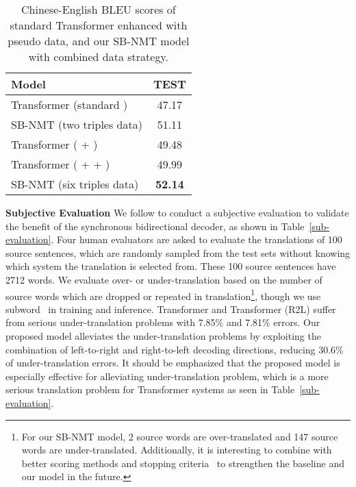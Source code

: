 \documentclass[11pt,a4paper]{article}
\begin{document}
\begin{CJK*}{UTF8}{gbsn}
\begin{table}
	\setlength{\belowcaptionskip}{-0.2cm}
	\centering
	\begin{tabular}{l|c}
		\hline
		Model                 &  TEST   \\
		\hline
		\hline
		Transformer (standard )             &  47.17  \\
		SB-NMT (two triples data)               &  51.11  \\
		\hline
		Transformer ( + )     &  49.48  \\
Transformer ( +   +  )     &  49.99  \\
\hline
		SB-NMT (six triples data)         &  \textbf{52.14}   \\		
		\hline
	\end{tabular}
	\caption{Chinese-English BLEU scores of standard Transformer enhanced with pseudo data, and our SB-NMT model with combined data strategy.
	} 
	\label{pesudo-data}
\end{table}


\textbf{Subjective Evaluation}
We follow  to conduct a subjective evaluation to validate the benefit of the synchronous bidirectional decoder, as shown in Table~\ref{sub-evaluation}.
Four human evaluators are asked to evaluate the translations of 100 source sentences, which are randomly sampled from the test sets without knowing which system the translation is selected from.
These 100 source sentences have 2712 words. We evaluate over- or under-translation based on the number of source words which are dropped or repeated in translation{\footnote[13]{For our SB-NMT model, 2 source words are over-translated and 147 source words are under-translated. Additionally, it is interesting to combine with better scoring methods and stopping criteria~\cite{D18-1342} to strengthen the baseline and our model in the future.}}, though we use subword~\cite{Sennrich:2016A} in training and inference.
Transformer and Transformer (R2L) suffer from serious under-translation problems with 7.85\% and 7.81\% errors.
Our proposed model alleviates the under-translation problems by exploiting the combination of left-to-right and right-to-left decoding directions, reducing 30.6\% of under-translation errors.
It should be emphasized that the proposed model is especially effective for alleviating under-translation problem, which is a more serious translation problem for Transformer systems as seen in Table~\ref{sub-evaluation}.


\end{CJK*}
\end{document}
